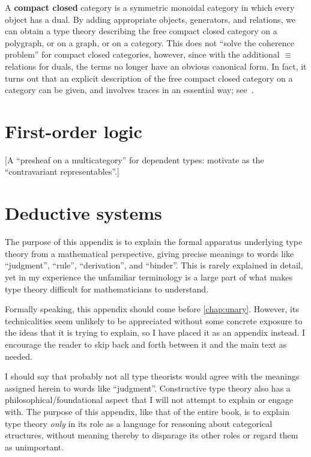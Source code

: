 \documentclass{book}
\begin{document}
\begin{rmk}
  A \textbf{compact closed} category is a symmetric monoidal category in which every object has a dual.
  By adding appropriate objects, generators, and relations, we can obtain a type theory describing the free compact closed category on a polygraph, or on a graph, or on a category.
  This does not ``solve the coherence problem'' for compact closed categories, however, since with the additional $\equiv$ relations for duals, the terms no longer have an obvious canonical form.
  In fact, it turns out that an explicit description of the free compact closed category on a category can be given, and involves traces in an essential way; see~\cite{kl:cpt}.
\end{rmk}


\chapter{First-order logic}
\label{chap:fol}

[A ``presheaf on a multicategory'' for dependent types: motivate as the ``contravariant representables''.]


\appendix

\chapter{Deductive systems}
\label{chap:dedsys}

The purpose of this appendix is to explain the formal apparatus underlying type theory from a mathematical perspective, giving precise meanings to words like ``judgment'', ``rule'', ``derivation'', and ``binder''.
This is rarely explained in detail, yet in my experience the unfamiliar terminology is a large part of what makes type theory difficult for mathematicians to understand.

Formally speaking, this appendix should come before \cref{chap:unary}.
However, its technicalities seem unlikely to be appreciated without some concrete exposure to the ideas that it is trying to explain, so I have placed it as an appendix instead.
I encourage the reader to skip back and forth between it and the main text as needed.

I should say that probably not all type theorists would agree with the meanings assigned herein to words like ``judgment''.
Constructive type theory also has a philosophical/foundational aspect that I will not attempt to explain or engage with.
The purpose of this appendix, like that of the entire book, is to explain type theory \emph{only} in its role as a language for reasoning about categorical structures, without meaning thereby to disparage its other roles or regard them as unimportant.
\end{document}
